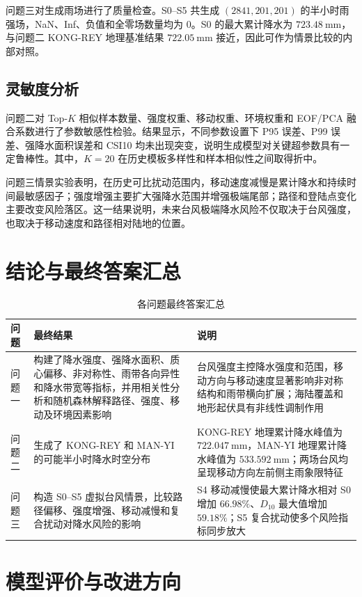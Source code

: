 \documentclass[UTF8,a4paper,zihao=5,fontset=fandol]{ctexart}
\numberwithin{equation}{section}
\numberwithin{figure}{section}
\numberwithin{table}{section}
\begin{document}
问题三对生成雨场进行了质量检查。S0--S5 共生成 $(2841,201,201)$ 的半小时雨强场，NaN、Inf、负值和全零场数量均为 $0$。S0 的最大累计降水为 $723.48\ \mathrm{mm}$，与问题二 KONG-REY 地理基准结果 $722.05\ \mathrm{mm}$ 接近，因此可作为情景比较的内部对照。

\subsection{灵敏度分析}
问题二对 Top-$K$ 相似样本数量、强度权重、移动权重、环境权重和 EOF/PCA 融合系数进行了参数敏感性检验。结果显示，不同参数设置下 P95 误差、P99 误差、强降水面积误差和 CSI10 均未出现突变，说明生成模型对关键超参数具有一定鲁棒性。其中，$K=20$ 在历史模板多样性和样本相似性之间取得折中。

问题三情景实验表明，在历史可比扰动范围内，移动速度减慢是累计降水和持续时间最敏感因子；强度增强主要扩大强降水范围并增强极端尾部；路径和登陆点变化主要改变风险落区。这一结果说明，未来台风极端降水风险不仅取决于台风强度，也取决于移动速度和路径相对陆地的位置。

\section{结论与最终答案汇总}

\begin{table}[H]
  \centering
  \caption{各问题最终答案汇总}
  \begin{tabularx}{\linewidth}{lXX}
    \toprule
    问题 & 最终结果 & 说明 \\
    \midrule
    问题一 & 构建了降水强度、强降水面积、质心偏移、非对称性、雨带各向异性和降水带宽等指标，并用相关性分析和随机森林解释路径、强度、移动及环境因素影响 & 台风强度主控降水强度和范围，移动方向与移动速度显著影响非对称结构和雨带横向扩展；海陆覆盖和地形起伏具有非线性调制作用 \\
    问题二 & 生成了 KONG-REY 和 MAN-YI 的可能半小时降水时空分布 & KONG-REY 地理累计降水峰值为 $722.047\ \mathrm{mm}$，MAN-YI 地理累计降水峰值为 $533.592\ \mathrm{mm}$；两场台风均呈现移动方向左前侧主雨象限特征 \\
    问题三 & 构造 S0--S5 虚拟台风情景，比较路径偏移、强度增强、移动减慢和复合扰动对降水风险的影响 & S4 移动减慢使最大累计降水相对 S0 增加 $66.98\%$、$D_{10}$ 最大值增加 $59.18\%$；S5 复合扰动使多个风险指标同步放大 \\
    \bottomrule
  \end{tabularx}
\end{table}

\section{模型评价与改进方向}
\end{document}
